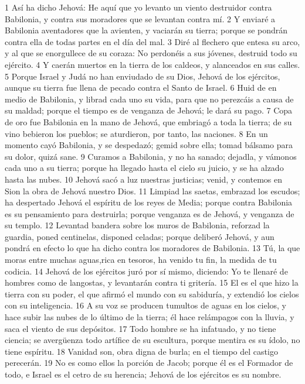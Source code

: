 1 Así ha dicho Jehová: He aquí que yo levanto un viento destruidor contra Babilonia, y contra sus moradores que se levantan contra mí.
2 Y enviaré a Babilonia aventadores que la avienten, y vaciarán su tierra; porque se pondrán contra ella de todas partes en el día del mal.
3 Diré al flechero que entesa su arco, y al que se enorgullece de su coraza: No perdonéis a sus jóvenes, destruid todo su ejército.
4 Y caerán muertos en la tierra de los caldeos, y alanceados en sus calles.
5 Porque Israel y Judá no han enviudado de su Dios, Jehová de los ejércitos, aunque su tierra fue llena de pecado contra el Santo de Israel.
6 Huid de en medio de Babilonia, y librad cada uno su vida, para que no perezcáis a causa de su maldad; porque el tiempo es de venganza de Jehová; le dará su pago.
7 Copa de oro fue Babilonia en la mano de Jehová, que embriagó a toda la tierra; de su vino bebieron los pueblos; se aturdieron, por tanto, las naciones.
8 En un momento cayó Babilonia, y se despedazó; gemid sobre ella; tomad bálsamo para su dolor, quizá sane.
9 Curamos a Babilonia, y no ha sanado; dejadla, y vámonos cada uno a su tierra; porque ha llegado hasta el cielo su juicio, y se ha alzado hasta las nubes.
10 Jehová sacó a luz nuestras justicias; venid, y contemos en Sion la obra de Jehová nuestro Dios.
11 Limpiad las saetas, embrazad los escudos; ha despertado Jehová el espíritu de los reyes de Media; porque contra Babilonia es su pensamiento para destruirla; porque venganza es de Jehová, y venganza de su templo.
12 Levantad bandera sobre los muros de Babilonia, reforzad la guardia, poned centinelas, disponed celadas; porque deliberó Jehová, y aun pondrá en efecto lo que ha dicho contra los moradores de Babilonia.
13 Tú, la que moras entre muchas aguas,rica en tesoros, ha venido tu fin, la medida de tu codicia.
14 Jehová de los ejércitos juró por sí mismo, diciendo: Yo te llenaré de hombres como de langostas, y levantarán contra ti gritería.
15 El es el que hizo la tierra con su poder, el que afirmó el mundo con su sabiduría, y extendió los cielos con su inteligencia.
16 A su voz se producen tumultos de aguas en los cielos, y hace subir las nubes de lo último de la tierra; él hace relámpagos con la lluvia, y saca el viento de sus depósitos.
17 Todo hombre se ha infatuado, y no tiene ciencia; se avergüenza todo artífice de su escultura, porque mentira es su ídolo, no tiene espíritu.
18 Vanidad son, obra digna de burla; en el tiempo del castigo perecerán.
19 No es como ellos la porción de Jacob; porque él es el Formador de todo, e Israel es el cetro de su herencia; Jehová de los ejércitos es su nombre.
